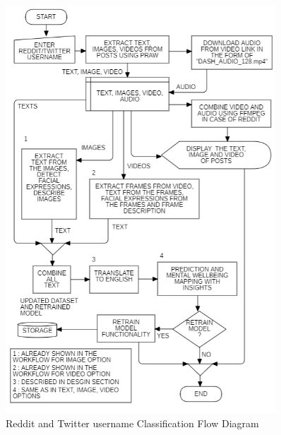 \pagebreak
\begin{figure}[h!]  
    \centering
    \includegraphics[width=0.9\textwidth]{Images/APP REDDIT.png}  
    \caption{Reddit and Twitter username Classification Flow Diagram}
    \label{01234i}  %
\end{figure}


\pagebreak






\pagebreak


